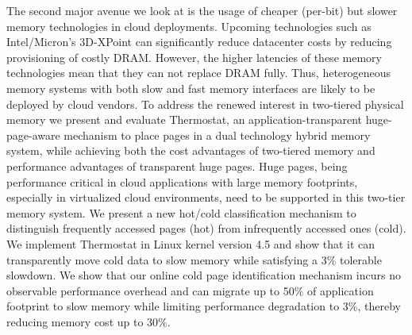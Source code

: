 The second major avenue we look at is the usage of cheaper (per-bit) but slower
memory technologies in cloud deployments. Upcoming technologies such as
Intel/Micron's 3D-XPoint can significantly reduce datacenter costs by reducing
provisioning of costly DRAM. However, the higher latencies of these memory
technologies mean that they can not replace DRAM fully. Thus, heterogeneous
memory systems with both slow and fast memory interfaces are likely to be
deployed by cloud vendors. To address the renewed interest in two-tiered
physical memory we present and evaluate Thermostat, an application-transparent
huge-page-aware mechanism to place pages in a dual technology hybrid memory
system, while achieving both the cost advantages of two-tiered memory and
performance advantages of transparent huge pages. Huge pages, being performance
critical in cloud applications with large memory footprints, especially in
virtualized cloud environments, need to be supported in this two-tier memory
system. We present a new hot/cold classification mechanism to distinguish
frequently accessed pages (hot) from infrequently accessed ones (cold).  We
implement Thermostat in Linux kernel version 4.5 and show that it can
transparently move cold data to slow memory while satisfying a 3\% tolerable
slowdown. We show that our online cold page identification mechanism incurs no
observable performance overhead and can migrate up to 50\% of application
footprint to slow memory while limiting performance degradation to 3\%, thereby
reducing memory cost up to 30\%.

%
%
